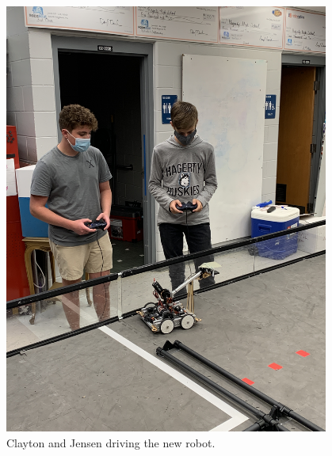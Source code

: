 \begin{figure}[ht]
\centering
\begin{minipage}[b]{.48\textwidth}
  \centering
  \includegraphics[width=0.95\textwidth]{Meetings/October/10-12-21/10-12-21_Team_Figure1 - Nathan Forrer.JPG}
  \caption{Clayton and Jensen driving the new robot.}
  \label{fig:pic1}
\end{minipage}%
\hfill%
\begin{minipage}[b]{.48\textwidth}
  \centering

\end{minipage}
\end{figure}
